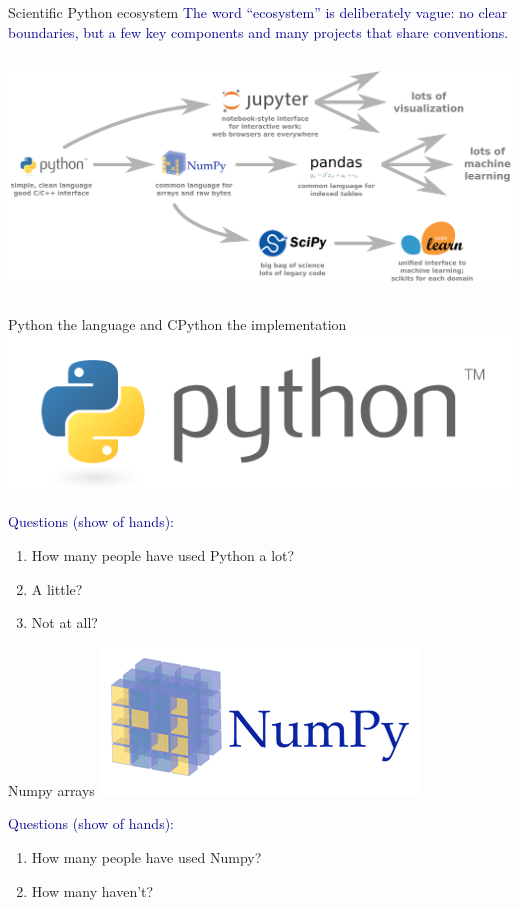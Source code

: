 \documentclass[aspectratio=169]{beamer}
\begin{document}
\begin{frame}{Scientific Python ecosystem}
\vspace{0.35 cm}
\textcolor{darkblue}{The word ``ecosystem'' is deliberately vague: no clear boundaries, but a few key components and many projects that share conventions.}

\begin{columns}
\includegraphics[width=\linewidth]{software-ecosystem.pdf}
\end{columns}
\end{frame}

\begin{frame}{Python the language and CPython the implementation}
\vspace{0.25 cm}
\hfill \includegraphics[height=1 cm]{python-logo.png}

\vspace{-1 cm}

\vfill
\small
\textcolor{darkblue}{Questions (show of hands):}
\vspace{-0.2 cm}
\begin{enumerate}\setlength{\itemsep}{-0.1 cm}
\item How many people have used Python a lot?
\item A little?
\item Not at all?
\end{enumerate}
\end{frame}

\begin{frame}{Numpy arrays}
\vspace{0.25 cm}
\hfill \includegraphics[height=1.3 cm]{numpy-logo.png}

\vspace{-1.3 cm}

\vfill
\small
\textcolor{darkblue}{Questions (show of hands):}
\vspace{-0.2 cm}
\begin{enumerate}\setlength{\itemsep}{-0.1 cm}
\item How many people have used Numpy?
\item How many haven't?
\end{enumerate}
\end{frame}
\end{document}
